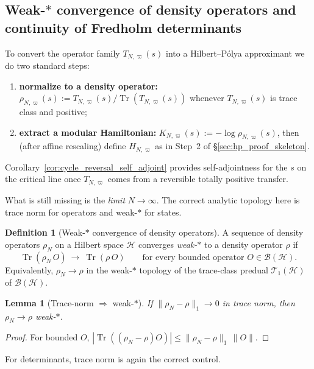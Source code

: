 \documentclass[11pt,oneside]{amsbook}
\numberwithin{equation}{section}
\theoremstyle{plain}
\newtheorem{lemma}[theorem]{Lemma}
\theoremstyle{definition}
\newtheorem{definition}[theorem]{Definition}
\theoremstyle{remark}
\DeclareMathOperator{\Tr}{\mathrm{Tr}}
\begin{document}
\subsection{Weak-$\ast$ convergence of density operators and continuity of Fredholm determinants}
\label{sec:weakstar_and_fredholm_continuity}

To convert the operator family $T_{N,\varpi}(s)$ into a Hilbert--Pólya approximant we do two standard steps:
\begin{enumerate}[label=(\roman*)]
\item \textbf{normalize to a density operator:} $\rho_{N,\varpi}(s):=T_{N,\varpi}(s)/\Tr(T_{N,\varpi}(s))$ whenever $T_{N,\varpi}(s)$ is trace class and positive;
\item \textbf{extract a modular Hamiltonian:} $K_{N,\varpi}(s):=-\log\rho_{N,\varpi}(s)$, then (after affine rescaling) define $H_{N,\varpi}$ as in Step~2 of \S\ref{sec:hp_proof_skeleton}.
\end{enumerate}
Corollary~\ref{cor:cycle_reversal_self_adjoint} provides self-adjointness for the $s$ on the critical line once $T_{N,\varpi}$ comes from a reversible totally positive transfer.

What is still missing is the \emph{limit} $N\to\infty$.
The correct analytic topology here is trace norm for operators and weak-$\ast$ for states.

\begin{definition}[Weak-$\ast$ convergence of density operators]
A sequence of density operators $\rho_N$ on a Hilbert space $\mathcal{H}$ converges \emph{weak-$\ast$} to a density operator $\rho$ if
\[
\Tr(\rho_N\,O)\ \longrightarrow\ \Tr(\rho\,O)
\qquad\text{for every bounded operator }O\in\mathcal{B}(\mathcal{H}).
\]
Equivalently, $\rho_N\to\rho$ in the weak-$\ast$ topology of the trace-class predual $\mathcal{T}_1(\mathcal{H})$ of $\mathcal{B}(\mathcal{H})$.
\end{definition}

\begin{lemma}[Trace-norm $\Rightarrow$ weak-$\ast$]
\label{lem:trace_norm_implies_weakstar}
If $\|\rho_N-\rho\|_1\to 0$ in trace norm, then $\rho_N\to\rho$ weak-$\ast$.
\end{lemma}
\begin{proof}
For bounded $O$, $|\Tr((\rho_N-\rho)O)|\le \|\rho_N-\rho\|_1\,\|O\|$.
\end{proof}

For determinants, trace norm is again the correct control.
\end{document}
